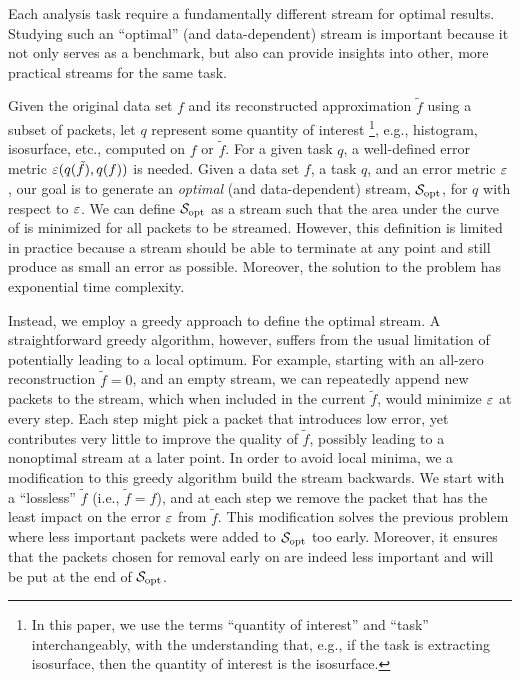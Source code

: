 Each analysis task   require a fundamentally different stream for optimal results.
Studying such an ``optimal'' (and data-dependent) stream is important because it not only serves as
a benchmark, but also can provide insights into other, more practical streams for the same task.

Given the original data set $f$ and its reconstructed approximation $\tilde{f}$ using a subset of
packets, let $q$ represent some quantity of interest \footnote{In this paper, we use the terms
``quantity of interest'' and ``task'' interchangeably, with the understanding that, e.g., if the
task is extracting isosurface, then the quantity of interest is the isosurface.}, e.g., histogram,
isosurface, etc., computed on $f$ or $\tilde{f}$. For a given task $q$, a well-defined error metric
$\err(q(\tilde{f}),q(f))$ is needed. Given a data set $f$, a task $q$, and an error metric $\err$,
our goal is to generate an \emph{optimal} (and data-dependent) stream, $\sopt$, for $q$ with respect
to $\err$. We can define $\sopt$ as a stream such that the area under the curve of \err is minimized
for all packets to be streamed. However, this definition is limited in practice because a stream
should be able to terminate at any point and still produce as small an error as possible. Moreover,
the solution to the problem has exponential time complexity.

Instead, we employ a greedy approach to define the optimal stream.  A straightforward greedy
algorithm, however, suffers from the usual limitation of potentially leading to a local optimum. For
example, starting with an all-zero reconstruction $\tilde{f}=0$, and an empty stream, we can
repeatedly append new packets to the stream, which when included in the current $\tilde{f}$, would
minimize $\err$ at every step. Each step might pick a packet that introduces low error, yet
contributes very little to improve the quality of $\tilde{f}$, possibly leading to a nonoptimal
stream at a later point. In order to avoid local minima, we   a modification to this greedy
algorithm  build the stream backwards. We start with a ``lossless'' $\tilde{f}$ (i.e.,
$\tilde{f}=f$), and at each step we remove the packet that has the least impact on the error $\err$
from $\tilde{f}$. This modification solves the previous problem where less important packets were
added to $\sopt$ too early. Moreover, it ensures that the packets chosen for removal early on are
indeed less important and will be put at the end of $\sopt$.

